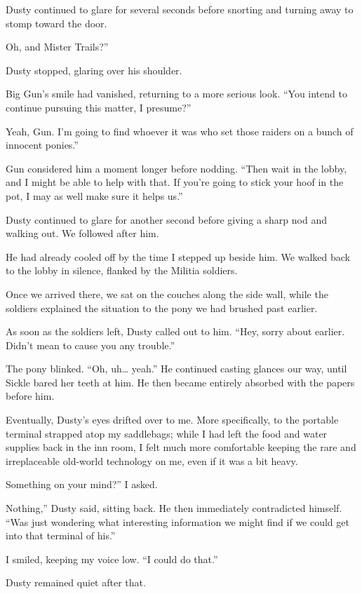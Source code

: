 Dusty continued to glare for several seconds before snorting and turning away to stomp toward the door.

\leavevmode{}Oh, and Mister Trails?”

Dusty stopped, glaring over his shoulder.

Big Gun’s smile had vanished, returning to a more serious look. “You intend to continue pursuing this matter, I presume?”

\leavevmode{}Yeah, Gun. I’m going to find whoever it was who set those raiders on a bunch of innocent ponies.”

Gun considered him a moment longer before nodding. “Then wait in the lobby, and I might be able to help with that. If you’re going to stick your hoof in the pot, I may as well make sure it helps us.”

Dusty continued to glare for another second before giving a sharp nod and walking out. We followed after him.

He had already cooled off by the time I stepped up beside him. We walked back to the lobby in silence, flanked by the Militia soldiers.

Once we arrived there, we sat on the couches along the side wall, while the soldiers explained the situation to the pony we had brushed past earlier.

As soon as the soldiers left, Dusty called out to him. “Hey, sorry about earlier. Didn’t mean to cause you any trouble.”

The pony blinked. “Oh, uh… yeah.” He continued casting glances our way, until Sickle bared her teeth at him. He then became entirely absorbed with the papers before him.

Eventually, Dusty’s eyes drifted over to me. More specifically, to the portable terminal strapped atop my saddlebags; while I had left the food and water supplies back in the inn room, I felt much more comfortable keeping the rare and irreplaceable old-world technology on me, even if it was a bit heavy.

\leavevmode{}Something on your mind?” I asked.

\leavevmode{}Nothing,” Dusty said, sitting back. He then immediately contradicted himself. “Was just wondering what interesting information we might find if we could get into that terminal of his.”

I smiled, keeping my voice low. “I could do that.”

Dusty remained quiet after that.

